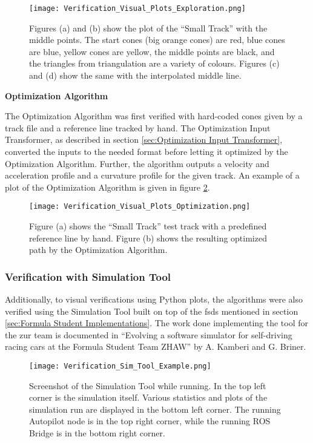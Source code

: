 \begin{figure}[H]
    \centering
    \texttt{[image: Verification\_Visual\_Plots\_Exploration.png]}
    \caption{Figures (a) and (b) show the plot of the ``Small Track'' with the middle points. The start cones (big orange cones) are red, blue cones are blue, yellow cones are yellow, the middle points are black, and the triangles from triangulation are a variety of colours. Figures (c) and (d) show the same with the interpolated middle line.}
    \label{fig:Verification Visual Plots Exploration}
\end{figure}

\textbf{Optimization Algorithm}

The Optimization Algorithm was first verified with hard-coded cones given by a track file and a reference line tracked by hand. The Optimization Input Transformer, as described in section \ref{sec:Optimization Input Transformer}, converted the inputs to the needed format before letting it optimized by the Optimization Algorithm. Further, the algorithm outputs a velocity and acceleration profile and a curvature profile for the given track. An example of a plot of the Optimization Algorithm is given in figure \ref{fig:Verification Visual Plots Optimization}.

\begin{figure}[H]
    \centering
    \texttt{[image: Verification\_Visual\_Plots\_Optimization.png]}
    \caption{Figure (a) shows the ``Small Track'' test track with a predefined reference line by hand. Figure (b) shows the resulting optimized path by the Optimization Algorithm.}
    \label{fig:Verification Visual Plots Optimization}
\end{figure}

\subsubsection{Verification with Simulation Tool} \label{sec:Verification with Simulation Tool}
Additionally, to visual verifications using Python plots, the algorithms were also verified using the Simulation Tool built on top of the \acrlong{fsds} mentioned in section \ref{sec:Formula Student Implementations}. The work done implementing the tool for the \acrlong{zur} team is documented in ``Evolving a software simulator for self-driving racing cars at the Formula Student Team ZHAW'' by A. Kamberi and G. Briner. \cite{zur_sim_tool}
\begin{figure}[H]
    \centering
    \texttt{[image: Verification\_Sim\_Tool\_Example.png]}
    \caption{Screenshot of the Simulation Tool while running. In the top left corner is the simulation itself. Various statistics and plots of the simulation run are displayed in the bottom left corner. The running Autopilot node is in the top right corner, while the running ROS Bridge is in the bottom right corner.}
    \label{fig:Verification Sim Tool Example}
\end{figure}

